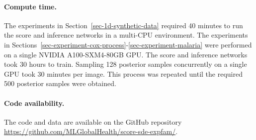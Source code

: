 \paragraph{Compute time.} 
The experiments in Section~\ref{sec-1d-synthetic-data} required 40 minutes to run the score and inference networks in a multi-CPU environment.
The experiments in Sections~\ref{sec-experiment-cox-process}-\ref{sec-experiment-malaria} were performed on a single NVIDIA A100-SXM4-80GB GPU. The score and inference networks took 30 hours to train. Sampling 128 posterior samples concurrently on a single GPU took 30 minutes per image. This process was repeated until the required 500 posterior samples were obtained.


\paragraph{Code availability.} The code and data are available on the GitHub repository \url{https://github.com/MLGlobalHealth/score-sde-expfam/}.